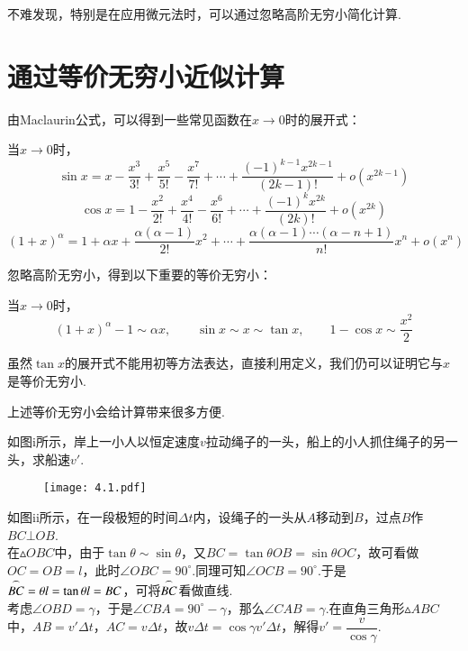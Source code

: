 不难发现，特别是在应用微元法时，可以通过忽略高阶无穷小简化计算.

\section{通过等价无穷小近似计算}

由Maclaurin公式，可以得到一些常见函数在$x \to 0$时的展开式：

\begin{proposition}
	当$x \to 0$时，
	$$\sin x = x - \frac{x^3}{3!} + \frac{x^5}{5!} - \frac{x^7}{7!} + \cdots + \frac{(-1)^{k-1}x^{2k-1}}{(2k-1)!} + o(x^{2k-1})$$
	$$\cos x = 1 - \frac{x^2}{2!} + \frac{x^4}{4!} - \frac{x^6}{6!} + \cdots + \frac{(-1)^{k}x^{2k}}{(2k)!} + o(x^{2k})$$
	$$(1+x)^{\alpha} = 1 + \alpha x + \frac{\alpha (\alpha -1)}{2!}x^2 + \cdots + \frac{\alpha (\alpha -1) \cdots (\alpha -n+1)}{n!} x^n + o(x^n)$$
\end{proposition}

忽略高阶无穷小，得到以下重要的等价无穷小：

\begin{proposition}
	当$x \to 0$时， 
	$$(1+x)^{\alpha} -1 \sim \alpha x, \qquad \sin x \sim x \sim\tan x, \qquad 1-\cos x \sim \dfrac{x^2}{2}$$
\end{proposition}
\begin{remark}
	虽然$\tan x$的展开式不能用初等方法表达，直接利用定义，我们仍可以证明它与$x$是等价无穷小.
\end{remark}

上述等价无穷小会给计算带来很多方便.

\begin{example}
	如图i所示，岸上一小人以恒定速度$v$拉动绳子的一头，船上的小人抓住绳子的另一头，求船速$v'$.
	\begin{figure}[htbp]
		\begin{center}
			\texttt{[image: 4.1.pdf]}
		\end{center}
	\caption{}
	\end{figure}
\end{example}
\begin{solution}
	如图ii所示，在一段极短的时间$\Delta t$内，设绳子的一头从$A$移动到$B$，过点$B$作$BC \bot OB$. \\
	在$\vartriangle OBC$中，由于$\tan \theta \sim \sin \theta$，又$BC = \tan \theta OB = \sin \theta OC$，故可看做$OC=OB=l$，此时$\angle OBC = 90^{\circ}$.同理可知$\angle OCB = 90^{\circ}$.于是$\overset{\LARGE{\frown}}{BC} = \theta l = \tan \theta l = BC$，可将$\overset{\LARGE{\frown}}{BC}$看做直线. \\
	考虑$\angle OBD=\gamma$，于是$\angle CBA=90^{\circ} - \gamma$，那么$\angle CAB = \gamma$.在直角三角形$\vartriangle ABC$中，$AB = v' \Delta t$，$AC = v \Delta t$，故$v \Delta t = \cos \gamma v' \Delta t$，解得$v' = \dfrac{v}{\cos \gamma}$.
\end{solution}

